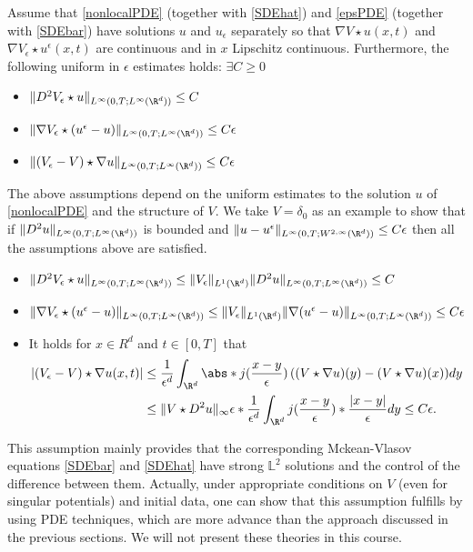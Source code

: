 \begin{assumption}\label{AssPDESol}
Assume that \autoref{nonlocalPDE} (together with \autoref{SDEhat}) and \autoref{epsPDE} (together with \autoref{SDEbar}) have solutions $u$ and $u_\epsilon$ separately so that $\nabla V\star u(x,t)$ and $\nabla V_\epsilon\star u^\epsilon(x,t)$ are continuous and in $x$ Lipschitz continuous. Furthermore, the following uniform in $\epsilon$ estimates holds: $\exists C\geq 0$ 
\begin{itemize}
	\item $\|D^2 V_\epsilon \star  u\|_{L^\infty(0,T;L^\infty(\R^d))}\leq C$ 
	\item $\|\nabla V_\epsilon \star (u^{\epsilon}-u )\|_{L^\infty(0,T;L^\infty(\R^d))}\leq C \epsilon$
	\item $\|(V_\epsilon - V) \star  \nabla u\|_{L^\infty(0,T;L^\infty(\R^d))}\leq C\epsilon$
\end{itemize}
\end{assumption}

\begin{remark}
The above assumptions depend on the uniform estimates to the solution $u$ of \autoref{nonlocalPDE} and the structure of $V$. We take $V=\delta_0$ as an example to show that if $\|D^2u\|_{L^\infty(0,T;L^\infty(\R^d))}$ is bounded and $\|u-u^\epsilon\|_{L^\infty(0,T;W^{2,\infty}(\R^d))}\leq C\epsilon$ then all the assumptions above are satisfied.
\begin{itemize}
	\item $\|D^2 V_\epsilon \star  u\|_{L^\infty(0,T;L^\infty(\R^d))}\leq \|V_\epsilon\|_{L^1(\R^d)}\|D^2  u\|_{L^\infty(0,T;L^\infty(\R^d))}\leq C$ 
	\item $\|\nabla V_\epsilon \star (u^{\epsilon}-u )\|_{L^\infty(0,T;L^\infty(\R^d))}\leq \|V_\epsilon\|_{L^1(\R^d)}\|\nabla (u^{\epsilon}-u )\|_{L^\infty(0,T;L^\infty(\R^d))}\leq C \epsilon$
	\item It holds for $x\in R^d$ and $t\in [0,T]$ that 
	\begin{align*}
	|(V_\epsilon - V) \star  \nabla u(x,t)|&\le \frac{1}{\epsilon ^{d} }  \int_{\R^d} \abs*{j(\frac{x-y}{\epsilon})\left((V\star \nabla u)(y) -  (V \star  \nabla u)(x)\right)} dy\\
	&\le \|V \star  D^2u\|_{\infty} \epsilon * \frac{1}{\epsilon ^{d} } \int_{\R^d}  j(\frac{x-y}{\epsilon})*\frac{|x-y|}{\epsilon} dy \leq C\epsilon
	.\end{align*}
\end{itemize}
\end{remark}
\vskip5mm
This assumption mainly provides that the corresponding Mckean-Vlasov equations \autoref{SDEbar} and \autoref{SDEhat} have strong $\mathbb{L}^2$ solutions and the control of the difference between them. Actually, under appropriate conditions on $V$ (even for singular potentials) and initial data, one can show that this assumption fulfills by using PDE techniques, which are more advance than the approach discussed in the previous sections. We will not present these theories in this course.

